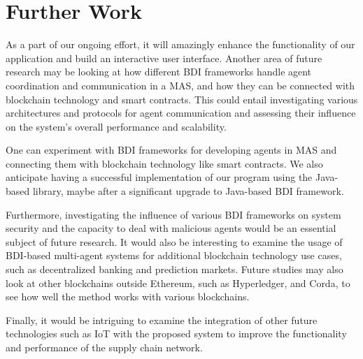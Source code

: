 {\chapter{Further Work}}
As a part of our ongoing effort, it will amazingly enhance the functionality of our application and build an interactive user interface. Another area of future research may be looking at how different \ac{BDI} frameworks handle agent coordination and communication in a \ac{MAS}, and how they can be connected with blockchain technology and smart contracts. This could entail investigating various architectures and protocols for agent communication and assessing their influence on the system's overall performance and scalability.

\vspace{.5cm}

One can experiment with \ac{BDI} frameworks for developing agents in \ac{MAS} and connecting them with blockchain technology like smart contracts. We also anticipate having a successful implementation of our program using the Java-based library, maybe after a significant upgrade to Java-based \ac{BDI} framework.

\vspace{.5cm}

Furthermore, investigating the influence of various \ac{BDI} frameworks on system security and the capacity to deal with malicious agents would be an essential subject of future research. It would also be interesting to examine the usage of \ac{BDI}-based multi-agent systems for additional blockchain technology use cases, such as decentralized banking and prediction markets. Future studies may also look at other blockchains outside Ethereum, such as Hyperledger, and Corda, to see how well the method works with various blockchains.

\vspace{.5cm}

Finally, it would be intriguing to examine the integration of other future technologies such as \ac{IoT} with the proposed system to improve the functionality and performance of the supply chain network.
